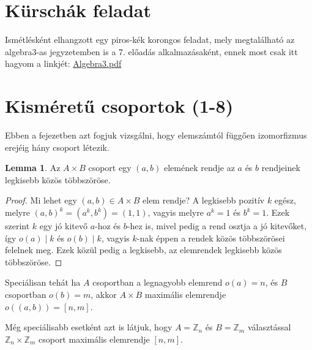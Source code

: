 \documentclass[12pt]{book}
\theoremstyle{plain} %
\theoremstyle{definition} %
\newtheorem{lem/}{Lemma}[section]
\newenvironment{lem}
  {\renewcommand{\qedsymbol}{$\clubsuit$}%
   \pushQED{\qed}\begin{lem/}}
  {\popQED\end{lem/}}
\theoremstyle{remark}
\renewcommand\qedsymbol{$\blacksquare$}
\numberwithin{equation}{section}  %
\def\Z{\mathbb{Z}}
\begin{document}
	
	\section{Kürschák feladat}
	
	Ismétlésként elhangzott egy piros-kék korongos feladat, mely megtalálható az algebra3-as jegyzetemben is a 7. előadás alkalmazásaként, ennek most csak itt hagyom a linkjét:  \href{http://vasgyura96.web.elte.hu/files/algebra3.pdf}{Algebra3.pdf}
	
	
	\section{Kisméretű csoportok (1-8)}
	Ebben a fejezetben azt fogjuk vizsgálni, hogy elemszámtól függően izomorfizmus erejéig hány csoport létezik.
	
	
	\begin{lem}\label{maxrend}
		Az $A\times B$ csoport egy $(a,b)$ elemének rendje az $a$ és $b$ rendjeinek legkisebb közös többszöröse.
	\end{lem}

	\begin{proof}
		Mi lehet egy $(a,b)\in A\times B$ elem rendje? A legkisebb pozitív $k$ egész, melyre $(a,b)^k = (a^k,b^k) = (1,1)$, vagyis melyre $a^k = 1$ és $b^k=1$. Ezek szerint $k$ egy jó kitevő $a$-hoz és $b$-hez is, mivel pedig a rend osztja a jó kitevőket, így $o(a)\mid k$ és $o(b) \mid k$, vagyis $k$-nak éppen a rendek közös többszörösei felelnek meg. Ezek közül pedig a legkisebb, az elemrendek legkisebb közös többszöröse.
	\end{proof}

	Speciálisan tehát ha $A$ csoportban a legnagyobb elemrend $o(a) = n$, és $B$ csoportban $o(b) = m$, akkor $A\times B$ maximális elemrendje $o\left((a,b)\right)  =[n,m]$.
	
	Még speciálisabb esetként azt is látjuk, hogy $A=\Z_n$ és $B=\Z_m$ választással $\Z_n\times \Z_m$ csoport maximális elemrendje $[n, m]$.
	
	
\end{document}
